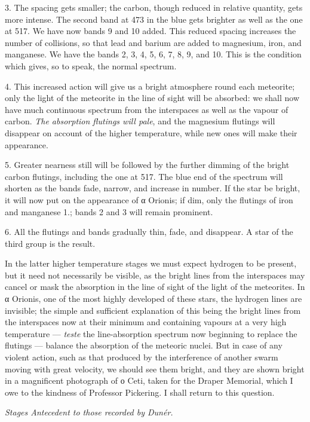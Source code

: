 \documentclass[a4paper, 12pt, oneside, polutonikogreek, english]{article}
\begin{document}
3. The spacing gets smaller; the carbon, though reduced in relative quantity, gets more intense. The second band at 473 in the blue gets brighter as well as the one at 517. We have now bands 9 and 10 added. This reduced spacing increases the number of collisions, so that lead and barium are added to magnesium, iron, and manganese. We have the bands 2, 3, 4, 5, 6, 7, 8, 9, and 10. This is the condition which gives, so to speak, the normal spectrum.

4. This increased action will give us a bright atmosphere round each meteorite; only the light of the meteorite in the line of sight will be absorbed: we shall now have much continuous spectrum from the interspaces as well as the vapour of carbon. \emph{The absorption flutings will pale}, and the magnesium flutings will disappear on account of the higher temperature, while new ones will make their appearance.

5. Greater nearness still will be followed by the further dimming of the bright carbon flutings, including the one at 517. The blue end of the spectrum will shorten as the bands fade, narrow, and increase in number. If the star be bright, it will now put on the appearance of α Orionis; if dim, only the flutings of iron and manganese 1.; bands 2 and 3 will remain prominent.

6. All the flutings and bands gradually thin, fade, and disappear. A star of the third group is the result.

In the latter higher temperature stages we must expect hydrogen to be present, but it need not necessarily be visible, as the bright lines from the interspaces may cancel or mask the absorption in the line of sight of the light of the meteorites. In α Orionis, one of the most highly developed of these stars, the hydrogen lines are invisible; the simple and sufficient explanation of this being the bright lines from the interspaces now at their minimum and containing vapours at a very high temperature --- \emph{teste} the line-absorption spectrum now beginning to replace the flutings --- balance the absorption of the meteoric nuclei. But in case of any violent action, such as that produced by the interference of another swarm moving with great velocity, we should see them bright, and they are shown bright in a magnificent photograph of ο Ceti, taken for the Draper Memorial, which I owe to the kindness of Professor Pickering. I shall return to this question.

\emph{Stages Antecedent to those recorded by Dunér.}
\end{document}

